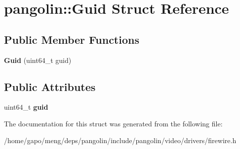 \hypertarget{structpangolin_1_1_guid}{}\section{pangolin\+:\+:Guid Struct Reference}
\label{structpangolin_1_1_guid}
\subsection*{Public Member Functions}
\begin{DoxyCompactItemize}
\item 
{\bfseries Guid} (uint64\+\_\+t guid)\hypertarget{structpangolin_1_1_guid_a6246eeb3363204f7004042e1fc993eb9}{}\label{structpangolin_1_1_guid_a6246eeb3363204f7004042e1fc993eb9}

\end{DoxyCompactItemize}
\subsection*{Public Attributes}
\begin{DoxyCompactItemize}
\item 
uint64\+\_\+t {\bfseries guid}\hypertarget{structpangolin_1_1_guid_a34bd8df4841301fe8d1cf45ece292b0f}{}\label{structpangolin_1_1_guid_a34bd8df4841301fe8d1cf45ece292b0f}

\end{DoxyCompactItemize}


The documentation for this struct was generated from the following file\+:\begin{DoxyCompactItemize}
\item 
/home/gapo/meng/deps/pangolin/include/pangolin/video/drivers/firewire.\+h\end{DoxyCompactItemize}
